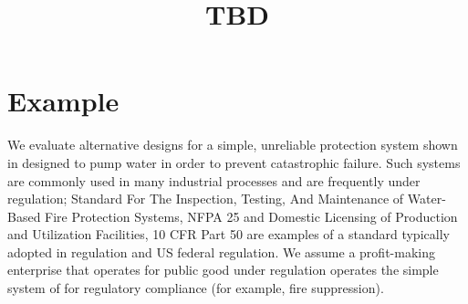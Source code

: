 \documentclass[review]{elsarticle}
\begin{document}
\begin{frontmatter}

\title{TBD}


\author[a]{}
\ead{}

\author[a]{}




\address[a]{TBD%
}
\begin{comment}
\begin{abstract}
A quantifiable method to obtain an ordered ranking of alternative maintenance policies in a simple system is summarized.
Application of the ranking method to economic analysis of a regulated process is described.
A new model for the impact of regulation and level of care on maintenance policy decision-making is
presented.
\end{abstract}

\begin{keyword}
RISMC \sep Maintenance policy \sep Decision analysis
\end{keyword}
\end{comment}

\end{frontmatter}

\section{Example}\label{sec:introduction}
	We evaluate alternative designs for a simple, unreliable protection system shown in 
	 designed to pump water in order to prevent catastrophic failure. 
	Such systems are commonly used in many industrial processes and are frequently under
	regulation; Standard For The Inspection, Testing, And Maintenance of Water-Based Fire Protection 
	Systems, NFPA 25 and Domestic Licensing of Production and Utilization Facilities, 10 CFR Part 50 are
	examples of a standard typically adopted in regulation and US federal regulation.
	We assume a profit-making enterprise that operates for public good under regulation operates the 
	simple system of  for regulatory compliance (for example, fire suppression).
	
\end{document}
